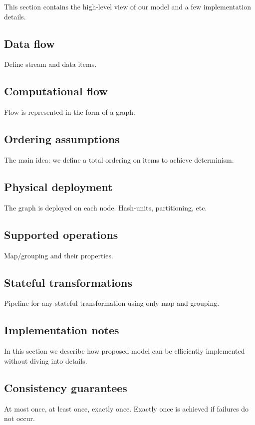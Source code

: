 
\label {fs-model-seciton}

This section contains the high-level view of our model and a few implementation details.

\subsection{Data flow}
Define stream and data items.

\subsection{Computational flow}
Flow is represented in the form of a graph.

\subsection{Ordering assumptions}
The main idea: we define a total ordering on items to achieve determinism.

\subsection{Physical deployment}
The graph is deployed on each node. Hash-units, partitioning, etc.

\subsection{Supported operations}
Map/grouping and their properties.

\subsection{Stateful transformations}
Pipeline for any stateful transformation using only map and grouping. 

\subsection{Implementation notes}
In this section we describe how proposed model can be efficiently implemented without diving into details.

\subsection{Consistency guarantees}
At most once, at least once, exactly once. Exactly once is achieved if failures do not occur.
